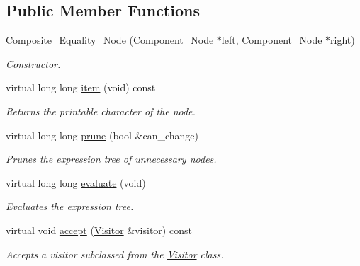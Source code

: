 \subsection*{Public Member Functions}
\begin{DoxyCompactItemize}
\item 
\hyperlink{classMadara_1_1Expression__Tree_1_1Composite__Equality__Node_a9d64fbc80800a828c20ed23c4ffb2d6f}{Composite\_\-Equality\_\-Node} (\hyperlink{classMadara_1_1Expression__Tree_1_1Component__Node}{Component\_\-Node} $\ast$left, \hyperlink{classMadara_1_1Expression__Tree_1_1Component__Node}{Component\_\-Node} $\ast$right)
\begin{DoxyCompactList}\small\item\em Constructor. \item\end{DoxyCompactList}\item 
virtual long long \hyperlink{classMadara_1_1Expression__Tree_1_1Composite__Equality__Node_a2f2eac9a039b4a187e5c7e680d5e86a0}{item} (void) const 
\begin{DoxyCompactList}\small\item\em Returns the printable character of the node. \item\end{DoxyCompactList}\item 
virtual long long \hyperlink{classMadara_1_1Expression__Tree_1_1Composite__Equality__Node_a91847a47177176e3c90a66a0af26e702}{prune} (bool \&can\_\-change)
\begin{DoxyCompactList}\small\item\em Prunes the expression tree of unnecessary nodes. \item\end{DoxyCompactList}\item 
virtual long long \hyperlink{classMadara_1_1Expression__Tree_1_1Composite__Equality__Node_a264f6762bfb2ac78a171df6798018185}{evaluate} (void)
\begin{DoxyCompactList}\small\item\em Evaluates the expression tree. \item\end{DoxyCompactList}\item 
virtual void \hyperlink{classMadara_1_1Expression__Tree_1_1Composite__Equality__Node_ab16daffb4e02f8020db7820ec4af6c90}{accept} (\hyperlink{classMadara_1_1Expression__Tree_1_1Visitor}{Visitor} \&visitor) const 
\begin{DoxyCompactList}\small\item\em Accepts a visitor subclassed from the \hyperlink{classMadara_1_1Expression__Tree_1_1Visitor}{Visitor} class. \item\end{DoxyCompactList}\item 

\end{DoxyCompactItemize}
